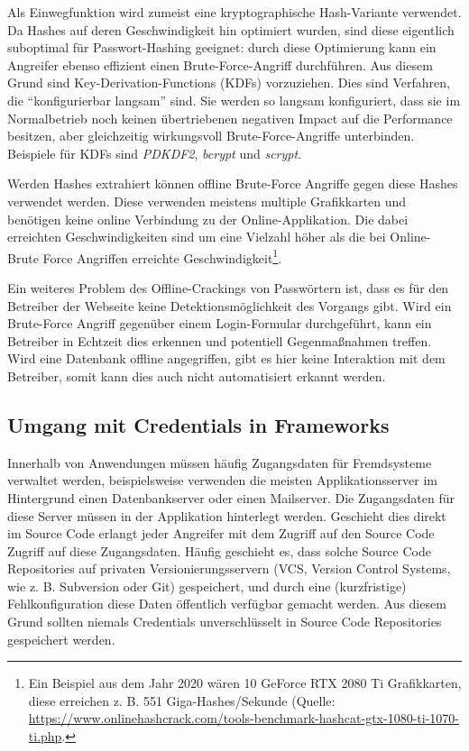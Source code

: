 Als Einwegfunktion wird zumeist eine kryptographische Hash-Variante verwendet. Da Hashes auf deren Geschwindigkeit hin optimiert wurden, sind diese eigentlich suboptimal für Passwort-Hashing geeignet: durch diese Optimierung kann ein Angreifer ebenso effizient einen Brute-Force-Angriff durchführen. Aus diesem Grund sind Key-Derivation-Functions (KDFs) vorzuziehen. Dies sind Verfahren, die ``konfigurierbar langsam'' sind. Sie werden so langsam konfiguriert, dass sie im Normalbetrieb noch keinen übertriebenen negativen Impact auf die Performance besitzen, aber gleichzeitig wirkungsvoll Brute-Force-Angriffe unterbinden. Beispiele für KDFs sind \textit{PDKDF2}, \textit{bcrypt} und \textit{scrypt}.

Werden Hashes extrahiert können offline Brute-Force Angriffe gegen diese Hashes verwendet werden. Diese verwenden meistens multiple Grafikkarten und benötigen keine online Verbindung zu der Online-Applikation. Die dabei erreichten Geschwindigkeiten sind um eine Vielzahl höher als die bei Online-Brute Force Angriffen erreichte Geschwindigkeit\footnote{Ein Beispiel aus dem Jahr 2020 wären 10 GeForce RTX 2080 Ti Grafikkarten, diese erreichen z. B. 551 Giga-Hashes/Sekunde (Quelle: \url{https://www.onlinehashcrack.com/tools-benchmark-hashcat-gtx-1080-ti-1070-ti.php}.}.

Ein weiteres Problem des Offline-Crackings von Passwörtern ist, dass es für den Betreiber der Webseite keine Detektionsmöglichkeit des Vorgangs gibt. Wird ein Brute-Force Angriff gegenüber einem Login-Formular durchgeführt, kann ein Betreiber in Echtzeit dies erkennen und potentiell Gegenmaßnahmen treffen. Wird eine Datenbank offline angegriffen, gibt es hier keine Interaktion mit dem Betreiber, somit kann dies auch nicht automatisiert erkannt werden.

\subsection{Umgang mit Credentials in Frameworks}

Innerhalb von Anwendungen müssen häufig Zugangsdaten für Fremdsysteme verwaltet werden, beispielsweise verwenden die meisten Applikationsserver im Hintergrund einen Datenbankserver oder einen Mailserver. Die Zugangsdaten für diese Server müssen in der Applikation hinterlegt werden. Geschieht dies direkt im Source Code erlangt jeder Angreifer mit dem Zugriff auf den Source Code Zugriff auf diese Zugangsdaten. Häufig geschieht es, dass solche Source Code Repositories auf privaten Versionierungsservern (VCS, Version Control Systems, wie z. B. Subversion oder Git) gespeichert, und durch eine (kurzfristige) Fehlkonfiguration diese Daten öffentlich verfügbar gemacht werden. Aus diesem Grund sollten niemals Credentials unverschlüsselt in Source Code Repositories gespeichert werden.

